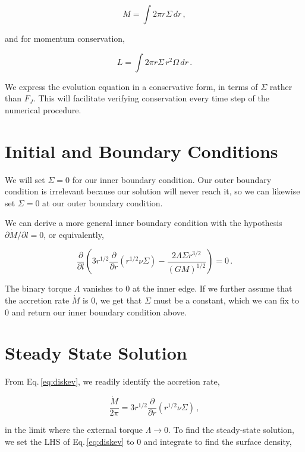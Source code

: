 \documentclass{article}
\begin{document}
\begin{equation}
M = \int 2\pi r \Sigma\, dr\,,
\end{equation}

and for momentum conservation,

\begin{equation}
\textit{L} = \int2\pi r \Sigma\, r^2 \Omega\, dr\,.
\end{equation}

We express the evolution equation in a conservative form, in terms of $\Sigma$ rather than $F_J$. This will facilitate verifying conservation every time step of the numerical procedure.

\section{Initial and Boundary Conditions}

We will set $\Sigma = 0$ for our inner boundary condition. Our outer boundary condition is irrelevant because our solution will never reach it, so we can likewise set $\Sigma = 0$ at our outer boundary condition. 

We can derive a more general inner boundary condition with the hypothesis $\partial \dot{M}/ \partial l = 0$, or equivalently,

\begin{equation}
\frac{\partial}{\partial l} \left(3 r^{1/2} \frac{\partial}{\partial r} \left(r^{1/2} \nu \Sigma\right) - \frac{2 \Lambda \Sigma r^{3/2}}{(G M)^{1/2}}\right)= 0\,.
\end{equation}

The binary torque $\Lambda$ vanishes to 0 at the inner edge. If we further assume that the accretion rate $\dot{M}$ is 0, we get that $\Sigma$ must be a constant, which we can fix to 0 and return our inner boundary condition above.

\section{Steady State Solution}

From Eq.\,\ref{eq:diskev}, we readily identify the accretion rate,

\begin{equation}
\frac{\dot{M}}{2\pi} = 3 r^{1/2} \frac{\partial}{\partial r} \left(r^{1/2} \nu \Sigma\right)\,,
\end{equation}

in the limit where the external torque $\Lambda \rightarrow 0$. To find the steady-state solution, we set the LHS of Eq.\,\ref{eq:diskev} to 0 and integrate to find the surface density,
\end{document}
